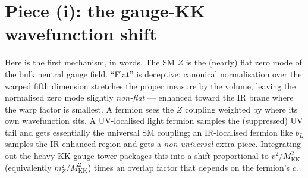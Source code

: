 \documentclass[11pt]{article}
\newcommand{\MKK}{M_{\mathrm{KK}}}
\newcommand{\vev}{v}
\theoremstyle{definition}
\begin{document}
\section{Piece (i): the gauge-KK wavefunction shift}
\label{sec:gauge}

Here is the first mechanism, in words. The SM $Z$ is the (nearly) flat zero mode
of the bulk neutral gauge field. ``Flat'' is deceptive: canonical normalisation
over the warped fifth dimension stretches the proper measure by the volume,
leaving the normalised zero mode slightly \emph{non-flat} --- enhanced toward the
IR brane where the warp factor is smallest. A fermion sees the $Z$ coupling
weighted by where its own wavefunction sits. A UV-localised light fermion samples
the (suppressed) UV tail and gets essentially the universal SM coupling; an
IR-localised fermion like $b_L$ samples the IR-enhanced region and gets a
\emph{non-universal} extra piece. Integrating out the heavy KK gauge tower
packages this into a shift proportional to $\vev^2/\MKK^2$ (equivalently
$m_Z^2/\MKK^2$) times an overlap factor that depends on the fermion's $c$.
\end{document}
